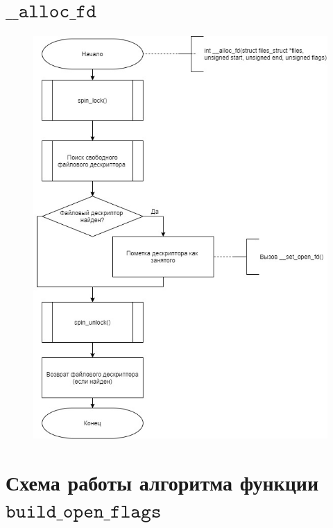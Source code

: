 \documentclass[a4paper,14pt]{extreport}
\begin{document}
\section{$\texttt{\_\_alloc\_fd}$}

\begin{figure}[H]
	\centering
	\includegraphics[scale=0.6]{img/alloc_fd.jpg}
	\label{fig:alloc_fd}
\end{figure}












\section{Схема работы алгоритма функции $\texttt{build\_open\_flags}$}
\end{document}

